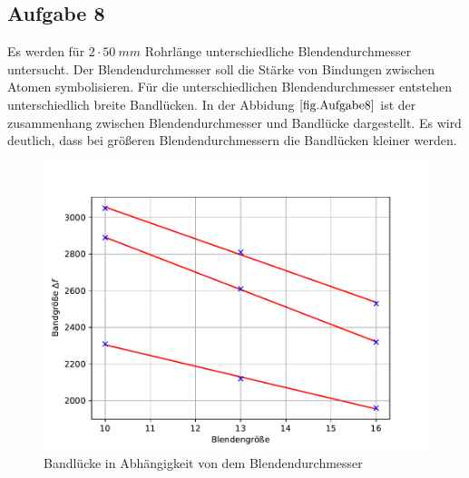 \subsection{Aufgabe 8}
Es werden für $2 \cdot \SI{50}{mm}$ Rohrlänge unterschiedliche Blendendurchmesser untersucht. Der Blendendurchmesser soll die Stärke von Bindungen zwischen Atomen symbolisieren.
Für die unterschiedlichen Blendendurchmesser entstehen unterschiedlich breite Bandlücken.
In der Abbidung $\ref{fig.Aufgabe8}$ ist der zusammenhang zwischen Blendendurchmesser und Bandlücke dargestellt.
Es wird deutlich, dass bei größeren Blendendurchmessern die Bandlücken kleiner werden.
\begin{figure}[h!]
  \centering
  \includegraphics[width=\textwidth]{A8.pdf}
  \caption{Bandlücke in Abhängigkeit von dem Blendendurchmesser}
  \label{fig.Aufgabe8}
\end{figure}
\FloatBarrier

